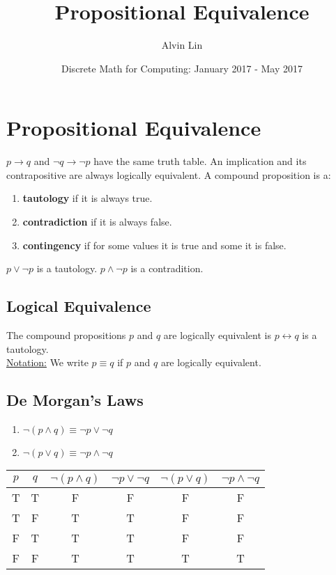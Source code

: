 \documentclass[letterpaper, 12pt]{math}
\title{Propositional Equivalence}
\author{Alvin Lin}
\date{Discrete Math for Computing: January 2017 - May 2017}
\begin{document}
\maketitle

\section*{Propositional Equivalence}
\( p \to q \)  and \( \neg{q} \to \neg{p} \) have the same truth table. An
implication and its contrapositive are always logically equivalent.
A compound proposition is a:
\begin{enumerate}
  \item \textbf{tautology} if it is always true.
  \item \textbf{contradiction} if it is always false.
  \item \textbf{contingency} if for some values it is true and some it is false.
\end{enumerate}
\( p \vee \neg{p} \) is a tautology. \( p \wedge \neg{p} \) is a contradition.

\subsection*{Logical Equivalence}
The compound propositions \( p \) and \( q \) are logically equivalent is
\( p \leftrightarrow q \) is a tautology. \\
\underline{Notation:} We write \( p \equiv q \) if \( p \) and \( q \) are
logically equivalent.

\subsection*{De Morgan's Laws}
\begin{enumerate}
  \item \( \neg{(p \wedge q)} \equiv \neg{p} \vee \neg{q} \)
  \item \( \neg{(p \vee q)} \equiv \neg{p} \wedge \neg{q} \)
\end{enumerate}
\begin{center}
  \begin{tabular}{|c|c|c|c|c|c|}
    \hline
    \( p \) & \( q \) & \( \neg{(p \wedge q)} \) & \( \neg{p} \vee \neg{q} \) &
    \( \neg{(p \vee q)} \) & \( \neg{p} \wedge \neg{q} \) \\ \hline
    T & T & F & F & F & F \\ \hline
    T & F & T & T & F & F \\ \hline
    F & T & T & T & F & F \\ \hline
    F & F & T & T & T & T \\ \hline
  \end{tabular}
\end{center}
\end{document}
